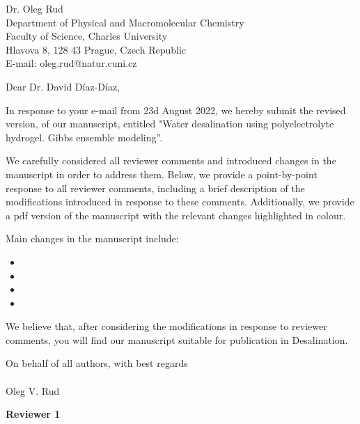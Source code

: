 \documentclass[12pt]{dinbrief}
\date{\today}
\newcommand{\theeditor}{Dr. David Díaz-Díaz}
\begin{document}
\begin{letter}{
Dr. Oleg Rud\\
Department of Physical and Macromolecular Chemistry\\
Faculty of Science, Charles University\\
Hlavova 8, 128 43 Prague, Czech Republic\\
E-mail: oleg.rud@natur.cuni.cz\\
}
\vspace*{-1.5cm}

\opening{Dear \theeditor,}


In response to your e-mail from 23d August 2022, we hereby submit the revised
version, of our manuscript, entitled "Water desalination using polyelectrolyte hydrogel. Gibbs ensemble modeling''.

We carefully considered all reviewer comments and introduced changes in the manuscript in order to address them.
Below, we provide a point-by-point response to all reviewer comments, including a brief description of the modifications introduced in response to these comments.
Additionally, we provide a pdf version of the manuscript with the relevant changes highlighted in colour.

Main changes in the manuscript include:
\begin{itemize}
    \item 
    \item 
    \item 
    \item 
\end{itemize}

We believe that, after considering the modifications in response to reviewer comments, you will find our manuscript suitable for publication in Desalination.

On behalf of all authors,
with best regards\\
\\
Oleg V. Rud\\


\end{letter}

\addtolength{\textwidth}{1.5cm}
\addtolength{\textheight}{2.0cm}



\textbf{Reviewer 1}
\textit{}
\end{document}
